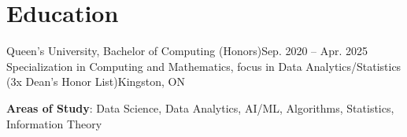\section{Education}
  \resumeSubHeadingListStart
    \resumeSubheading
      {Queen's University, Bachelor of Computing (Honors)}{Sep. 2020 -- Apr. 2025}
      {Specialization in Computing and Mathematics, focus in Data Analytics/Statistics (3x Dean's Honor List)}{Kingston, ON}
      \begin{itemize}[leftmargin=0.0in, label={}]
    \small{\item{
     \textbf{Areas of Study}{: Data Science, Data Analytics, AI/ML, Algorithms, Statistics, Information Theory}
    }}
 \end{itemize}
  \resumeSubHeadingListEnd